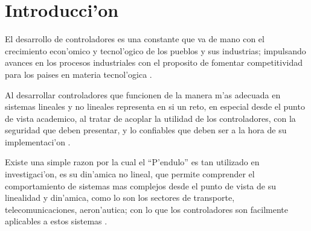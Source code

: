 \setcounter{page}{1}

\chapter{Introducci'on}



El desarrollo de controladores es una constante que va de mano con el crecimiento econ'omico y tecnol'ogico
de los pueblos y sus industrias; impulsando avances en los procesos industriales con el proposito de fomentar competitividad para los paises en materia tecnol'ogica \citep{odanilo}.

Al desarrollar controladores que funcionen de la manera m'as adecuada en sistemas lineales y no lineales
representa en si un reto, en especial desde el punto de vista academico, al tratar de acoplar la utilidad de 
los controladores, con la seguridad que deben presentar, y lo confiables que deben ser a la hora de su implementaci'on  \citep{odanilo}.

	Existe una simple razon por la cual el ``P'endulo'' es tan utilizado en investigaci'on, es su din'amica no lineal, que permite comprender el comportamiento de sistemas mas complejos desde el punto de vista de su linealidad y din'amica, como lo son los sectores de transporte, telecomunicaciones, aeron'autica; con lo que los controladores son facilmente aplicables a estos sistemas \citep{odanilo}.
	
